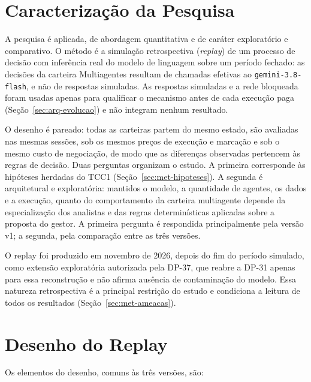 \documentclass{eic-bcc-tcc}
\begin{document}
\section{Caracterização da Pesquisa}
\label{sec:met-caracterizacao}

A pesquisa é aplicada, de abordagem quantitativa e de caráter exploratório e comparativo. O método é a simulação retrospectiva (\textit{replay}) de um processo de decisão com inferência real do modelo de linguagem sobre um período fechado: as decisões da carteira Multiagentes resultam de chamadas efetivas ao \texttt{gemini-3.8-flash}, e não de respostas simuladas. As respostas simuladas e a rede bloqueada foram usadas apenas para qualificar o mecanismo antes de cada execução paga (Seção~\ref{sec:arq-evolucao}) e não integram nenhum resultado.

O desenho é pareado: todas as carteiras partem do mesmo estado, são avaliadas nas mesmas sessões, sob os mesmos preços de execução e marcação e sob o mesmo custo de negociação, de modo que as diferenças observadas pertencem às regras de decisão. Duas perguntas organizam o estudo. A primeira corresponde às hipóteses herdadas do TCC1 (Seção~\ref{sec:met-hipoteses}). A segunda é arquitetural e exploratória: mantidos o modelo, a quantidade de agentes, os dados e a execução, quanto do comportamento da carteira multiagente depende da especialização dos analistas e das regras determinísticas aplicadas sobre a proposta do gestor. A primeira pergunta é respondida principalmente pela versão v1; a segunda, pela comparação entre as três versões.

O replay foi produzido em novembro de 2026, depois do fim do período simulado, como extensão exploratória autorizada pela DP-37, que reabre a DP-31 apenas para essa reconstrução e não afirma ausência de contaminação do modelo. Essa natureza retrospectiva é a principal restrição do estudo e condiciona a leitura de todos os resultados (Seção~\ref{sec:met-ameacas}).

\section{Desenho do Replay}
\label{sec:met-desenho}

Os elementos do desenho, comuns às três versões, são:
\end{document}
